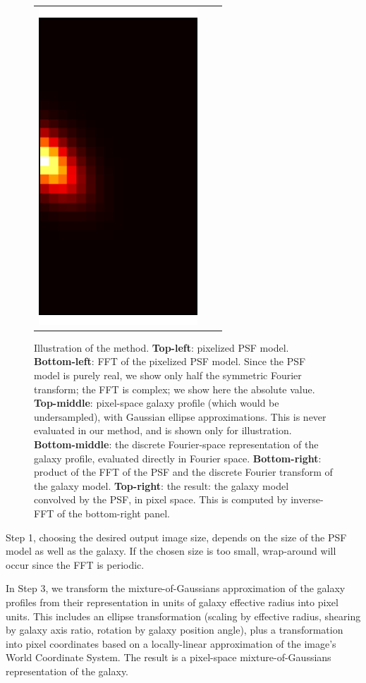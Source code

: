 \documentclass[11pt,preprint]{aastex}
\newcommand{\trick}{method}
\begin{document}
\begin{figure}
\begin{center}
\begin{tabular}{@{}ccc@{}}
      \multicolumn{1}{r}{%
        \includegraphics[height=0.22\textwidth]{psf-03}}
    \end{tabular}
  \end{center}
  \caption{\label{fig:example}
    Illustration of the \trick.
    \textbf{Top-left}: pixelized PSF model.
    \textbf{Bottom-left}: FFT of the pixelized PSF model.  Since the PSF model is
    purely real, we show only half the symmetric Fourier transform; the FFT is
    complex; we show here the absolute value.
    \textbf{Top-middle}: pixel-space galaxy profile (which would be
    undersampled), with Gaussian ellipse approximations.  This is
    never evaluated in our method, and is shown only for illustration.
    \textbf{Bottom-middle}: the discrete Fourier-space representation of the
    galaxy profile, evaluated directly in Fourier space.
    \textbf{Bottom-right}: product of the FFT of the PSF and the
    discrete Fourier transform of the galaxy model.
    \textbf{Top-right}: the result: the galaxy model convolved by the
    PSF, in pixel space.  This is computed by inverse-FFT of the
    bottom-right panel.
  }
\end{figure}

Step 1, choosing the desired output image size, depends on the size of
the PSF model as well as the galaxy.  If the chosen size is too small,
wrap-around will occur since the FFT is periodic.

In Step 3, we transform the mixture-of-Gaussians approximation of the
galaxy profiles from their representation in units of galaxy effective
radius into pixel units.  This includes an ellipse transformation
(scaling by effective radius, shearing by galaxy axis ratio, rotation
by galaxy position angle), plus a transformation into pixel
coordinates based on a locally-linear approximation of the image's
World Coordinate System.
The result is a pixel-space mixture-of-Gaussians representation of the
galaxy.
\end{document}
